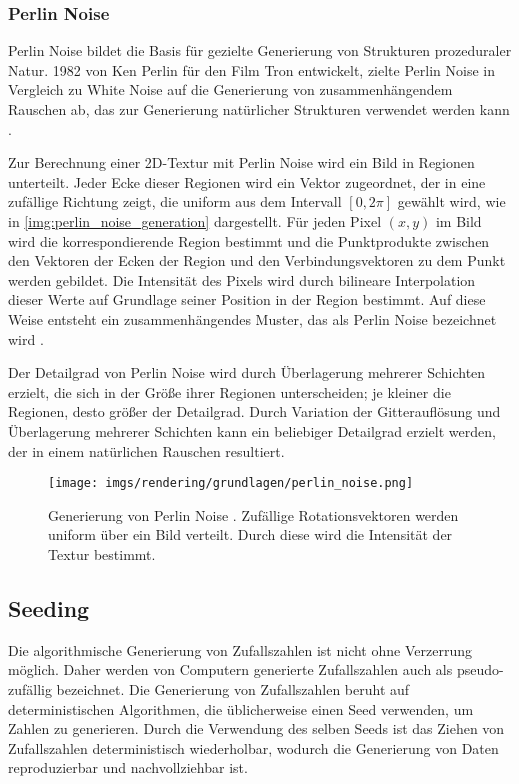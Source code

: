 \subsubsection{Perlin Noise}

Perlin Noise bildet die Basis für gezielte Generierung von Strukturen prozeduraler Natur. 1982 von Ken Perlin für den Film Tron entwickelt, zielte Perlin Noise in Vergleich zu White Noise auf die Generierung von zusammenhängendem Rauschen ab, das zur Generierung natürlicher Strukturen verwendet werden kann \cite{perlin_noise_original,perlin_noise_extension}.

Zur Berechnung einer 2D-Textur mit Perlin Noise wird ein Bild in Regionen unterteilt. Jeder Ecke dieser Regionen wird ein Vektor zugeordnet, der in eine zufällige Richtung zeigt, die uniform aus dem Intervall $[0, 2\pi]$ gewählt wird, wie in \autoref{img:perlin_noise_generation} dargestellt. Für jeden Pixel $(x, y)$ im Bild wird die korrespondierende Region bestimmt und die Punktprodukte zwischen den Vektoren der Ecken der Region und den Verbindungsvektoren zu dem Punkt werden gebildet. Die Intensität des Pixels wird durch bilineare Interpolation dieser Werte auf Grundlage seiner Position in der Region bestimmt. Auf diese Weise entsteht ein zusammenhängendes Muster, das als Perlin Noise bezeichnet wird \cite{perlin_noise_original}.

Der Detailgrad von Perlin Noise wird durch Überlagerung mehrerer Schichten erzielt, die sich in der Größe ihrer Regionen unterscheiden; je kleiner die Regionen, desto größer der Detailgrad. Durch Variation der Gitterauflösung und Überlagerung mehrerer Schichten kann ein beliebiger Detailgrad erzielt werden, der in einem natürlichen Rauschen resultiert.

\begin{figure}
    \centering
    \texttt{[image: imgs/rendering/grundlagen/perlin\_noise.png]}
    \caption{Generierung von Perlin Noise \cite{perlin_noise_img}. Zufällige Rotationsvektoren werden uniform über ein Bild verteilt. Durch diese wird die Intensität der Textur bestimmt.}
    \label{img:perlin_noise_generation}
\end{figure}

\subsection{Seeding}
\label{sec:seeding}

Die algorithmische Generierung von Zufallszahlen ist nicht ohne Verzerrung möglich. Daher werden von Computern generierte Zufallszahlen auch als pseudo-zufällig bezeichnet. Die Generierung von Zufallszahlen beruht auf deterministischen Algorithmen, die üblicherweise einen Seed verwenden, um Zahlen zu generieren. Durch die Verwendung des selben Seeds ist das Ziehen von Zufallszahlen deterministisch wiederholbar, wodurch die Generierung von Daten reproduzierbar und nachvollziehbar ist.

